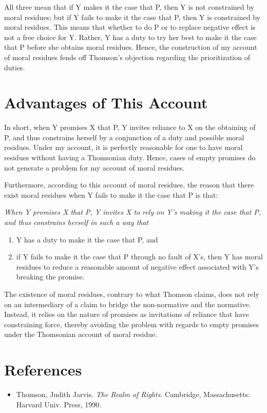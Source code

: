 All three mean that if Y makes it the case that P, then Y is not
constrained by moral residues; but if Y fails to make it the case that
P, then Y is constrained by moral residues. This means that whether to
do P or to replace negative effect is not a free choice for Y. Rather, Y
has a duty to try her best to make it the case that P before she obtains
moral residues. Hence, the construction of my account of moral residues
fends off Thomson's objection regarding the prioritization of duties.

\section{Advantages of This Account}

In short, when Y promises X that P, Y invites reliance to X on the
obtaining of P, and thus constrains herself by a conjunction of a duty
and possible moral residues. Under my account, it is perfectly
reasonable for one to have moral residues without having a Thomsonian
duty. Hence, cases of empty promises do not generate a problem for my
account of moral residues.

Furthermore, according to this account of moral residues, the reason
that there exist moral residues when Y fails to make it the case that P
is that:

\begin{displayquote} \def\labelenumi{(\arabic{enumi})}
	\itshape When Y promises X that P, Y invites X to rely on Y's making it the
case that P, and thus constrains herself in such a way that
	\begin{enumerate}
		\item  Y has a duty to make it the case that P, and
		\item if Y fails to make it the case that P through no fault of X's,
then Y has moral residues to reduce a reasonable amount of negative
effect associated with Y's breaking the promise. 
	\end{enumerate}
\end{displayquote}
\noindent
The existence of moral residues, contrary to what Thomson claims, does
not rely on an intermediary of a claim to bridge the non-normative and
the normative. Instead, it relies on the nature of promises as
invitations of reliance that have constraining force, thereby avoiding
the problem with regards to empty promises under the Thomsonian account
of moral residue.

\section*{References}

\begin{itemize}[label={},itemindent=-2em,leftmargin=2em]
	\item Thomson, Judith Jarvis. \emph{The Realm of Rights}. Cambridge, Massachusetts: Harvard Univ. Press, 1990.
\end{itemize}

